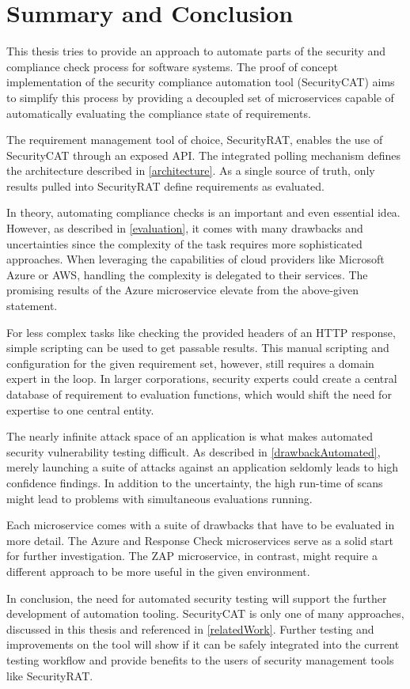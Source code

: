 \chapter{Summary and Conclusion}
This thesis tries to provide an approach to automate parts of the security and compliance check process for software systems.
The proof of concept implementation of the security compliance automation tool (SecurityCAT) aims to simplify this process by providing a decoupled set of microservices capable of automatically evaluating the compliance state of requirements.

The requirement management tool of choice, SecurityRAT, enables the use of SecurityCAT through an exposed API. The integrated polling mechanism defines the architecture described in \ref{architecture}. As a single source of truth, only results pulled into SecurityRAT define requirements as evaluated.

In theory, automating compliance checks is an important and even essential idea. However, as described in \ref{evaluation}, it comes with many drawbacks and uncertainties since the complexity of the task requires more sophisticated approaches. When leveraging the capabilities of cloud providers like Microsoft Azure or AWS, handling the complexity is delegated to their services.
The promising results of the Azure microservice elevate from the above-given statement.

For less complex tasks like checking the provided headers of an HTTP response, simple scripting can be used to get passable results. This manual scripting and configuration for the given requirement set, however, still requires a domain expert in the loop. In larger corporations, security experts could create a central database of requirement to evaluation functions, which would shift the need for expertise to one central entity.

The nearly infinite attack space of an application is what makes automated security vulnerability testing difficult. As described in \ref{drawbackAutomated}, merely launching a suite of attacks against an application seldomly leads to high confidence findings.
In addition to the uncertainty, the high run-time of scans might lead to problems with simultaneous evaluations running.

Each microservice comes with a suite of drawbacks that have to be evaluated in more detail. The Azure and Response Check microservices serve as a solid start for further investigation. The ZAP microservice, in contrast, might require a different approach to be more useful in the given environment.

In conclusion, the need for automated security testing will support the further development of automation tooling. SecurityCAT is only one of many approaches, discussed in this thesis and referenced in \ref{relatedWork}.
Further testing and improvements on the tool will show if it can be safely integrated into the current testing workflow and provide benefits to the users of security management tools like SecurityRAT.